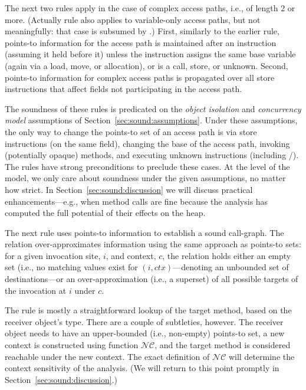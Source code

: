 The next two rules apply in the case of complex access paths, i.e., of length 2 or more. (Actually rule  also applies to variable-only access paths, but not meaningfully: that case is subsumed by .) First, similarly to the earlier rule, points-to information for the access path is maintained after an instruction (assuming it held before it) unless the instruction assigns the same base variable (again via a load, move, or allocation), or is a call, store, or unknown. Second, points-to information for complex access paths is propagated over all store instructions that affect fields not participating in the access path.

The soundness of these rules is predicated on the \emph{object isolation} and \emph{concurrency model} assumptions of Section~\ref{sec:sound:assumptions}. Under these assumptions, the only way to change the points-to set of an access path is via store instructions (on the same field), changing the base of the access path, invoking (potentially opaque) methods, and executing unknown instructions (including /). The rules have strong preconditions to preclude these cases. At the level of the model, we only care about soundness under the given assumptions, no matter how strict. In Section~\ref{sec:sound:discussion} we will discuss practical enhancements---e.g., when method calls are fine because the analysis has computed the full potential of their effects on the heap.


The next rule uses points-to information to establish a sound call-graph. The  relation over-approximates information using the same approach as points-to sets: for a given invocation site, $i$, and context, $c$, the relation holds either an empty set (i.e., no matching values exist for $(i, ctx)$---denoting an unbounded set of destinations---or an over-approximation (i.e., a superset) of all possible targets of the invocation at $i$ under $c$.

The rule is mostly a straightforward lookup of the target method, based on the receiver object's type. There are a couple of subtleties, however. The receiver object needs to have an upper-bounded (i.e., non-empty) points-to set, a new context is constructed using function $\mathcal{NC}$, and the target method is considered reachable under the new context. The exact definition of $\mathcal{NC}$ will determine the context sensitivity of the analysis. (We will return to this point promptly in Section~\ref{sec:sound:discussion}.)


